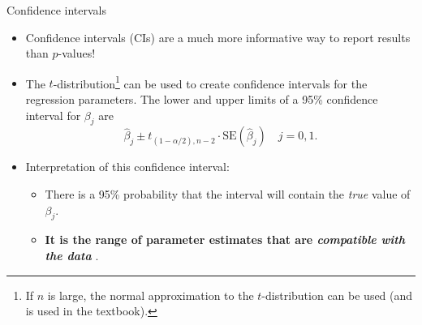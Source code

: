 \documentclass[10pt,ignorenonframetext,]{beamer}
\providecommand{\tightlist}{%
  \setlength{\itemsep}{0pt}\setlength{\parskip}{0pt}}
\begin{document}
\begin{frame}

\begin{block}{Confidence intervals}

\vspace{2mm}

\begin{itemize}
\tightlist
\item
  Confidence intervals (CIs) are a much more informative way to report
  results than \(p\)-values!
\end{itemize}

\vspace{1mm}

\begin{itemize}
\tightlist
\item
  The
  \(t\)-distribution\footnote{If $n$ is large, the normal approximation to the $t$-distribution can be used (and is used in the textbook).}
  can be used to create confidence intervals for the regression
  parameters. The lower and upper limits of a 95\% confidence interval
  for \(\beta_j\) are
  \[\hat{\beta}_j \pm t_{(1-\alpha/2),n-2} \cdot\text{SE} (\hat{\beta}_j) \quad j=0, 1.\]
\end{itemize}

\vspace{1mm}

\begin{itemize}
\item
  Interpretation of this confidence interval:

  \begin{itemize}
  \item
    There is a 95\% probability that the interval will contain the
    \emph{true} value of \(\beta_j\).
  \item
    \textbf{It is the range of parameter estimates that are
    \emph{compatible with the data} }.
  \end{itemize}
\end{itemize}

\end{block}

\end{frame}
\end{document}

